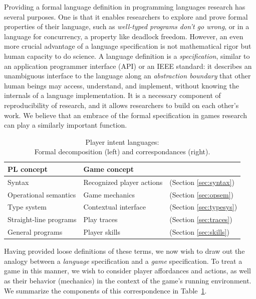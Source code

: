   Providing a formal language definition in programming languages research
  has several purposes. One is that it enables researchers to explore
  and prove formal properties of their language, such as {\em well-typed
  programs don't go wrong}, or in a language for concurrency, a property
  like deadlock freedom. However, an even more crucial advantage of a
  language specification is not mathematical rigor but human capacity to do
  science. A language definition is a {\em specification}, similar to an
  application programmer interface (API) or an IEEE standard: it describes
  an unambiguous interface to the language along an {\em abstraction
  boundary} that other human beings may access, understand, and implement,
  without knowing the internals of a language implementation.  It is a
  necessary component of reproducibility of research, and it allows
  researchers to build on each other's work. We believe that an embrace of
  the formal specification in games research can play a similarly important
  function.

  \begin{table}
  \begin{tabular}{l|ll}
    PL concept & Game concept\\
    \hline
    Syntax & Recognized player actions & (Section \ref{sec:syntax})\\
    Operational semantics & Game mechanics & (Section \ref{sec:opsem})\\
    Type system & Contextual interface & (Section \ref{sec:typesys})\\
    Straight-line programs & Play traces & (Section \ref{sec:traces})\\ 
    General programs & Player skills & (Section \ref{sec:skills})
    \\
    \hline
  \end{tabular}
  \caption{Player intent languages: 
    \\
    Formal decomposition (left) and correspondances (right).}
  \label{tab:correspondence}
  \end{table}

  Having provided loose definitions of these terms, we now wish to draw out
  the analogy between a {\em language} specification and a {\em game}
  specification. To treat a game in this manner, we wish to consider player
  affordances and actions, as well as their behavior (mechanics) in the
  context of the game's running environment. We summarize the components of
  this correspondence in Table~\ref{tab:correspondence}.

